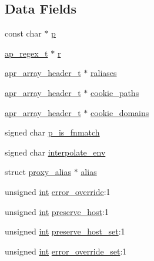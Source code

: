 \subsection*{Data Fields}
\begin{DoxyCompactItemize}
\item 
const char $\ast$ \hyperlink{structproxy__dir__conf_abbc2c066378f469f5c54717c505129b0}{p}
\item 
\hyperlink{structap__regex__t}{ap\+\_\+regex\+\_\+t} $\ast$ \hyperlink{structproxy__dir__conf_a4c14d033d9011ed317dd609a31dfb686}{r}
\item 
\hyperlink{structapr__array__header__t}{apr\+\_\+array\+\_\+header\+\_\+t} $\ast$ \hyperlink{structproxy__dir__conf_a3731711b40c68911395e2fd1f3cba016}{raliases}
\item 
\hyperlink{structapr__array__header__t}{apr\+\_\+array\+\_\+header\+\_\+t} $\ast$ \hyperlink{structproxy__dir__conf_abd71e05b8b000ab3445114fabee0c792}{cookie\+\_\+paths}
\item 
\hyperlink{structapr__array__header__t}{apr\+\_\+array\+\_\+header\+\_\+t} $\ast$ \hyperlink{structproxy__dir__conf_a05779ee6c22eaafe90f19c7f36ffbd63}{cookie\+\_\+domains}
\item 
signed char \hyperlink{structproxy__dir__conf_ab3d1b2973460e41d25baee568bedc576}{p\+\_\+is\+\_\+fnmatch}
\item 
signed char \hyperlink{structproxy__dir__conf_a14c09f00a8ef3fd674edf324e204f716}{interpolate\+\_\+env}
\item 
struct \hyperlink{structproxy__alias}{proxy\+\_\+alias} $\ast$ \hyperlink{structproxy__dir__conf_a6b0f7adaf6e4112383e9442337b10252}{alias}
\item 
unsigned \hyperlink{pcre_8txt_a42dfa4ff673c82d8efe7144098fbc198}{int} \hyperlink{structproxy__dir__conf_a3aea74a60ef8fc76563cb6f4a9ebb3d1}{error\+\_\+override}\+:1
\item 
unsigned \hyperlink{pcre_8txt_a42dfa4ff673c82d8efe7144098fbc198}{int} \hyperlink{structproxy__dir__conf_ab866a9816beea17c38a145be11807857}{preserve\+\_\+host}\+:1
\item 
unsigned \hyperlink{pcre_8txt_a42dfa4ff673c82d8efe7144098fbc198}{int} \hyperlink{structproxy__dir__conf_aa9adec88b24a342598f73d45759a5fd1}{preserve\+\_\+host\+\_\+set}\+:1
\item 
unsigned \hyperlink{pcre_8txt_a42dfa4ff673c82d8efe7144098fbc198}{int} \hyperlink{structproxy__dir__conf_a394c68f9c1ec6a3b7868c544fc7722bf}{error\+\_\+override\+\_\+set}\+:1
\item 

\end{DoxyCompactItemize}
